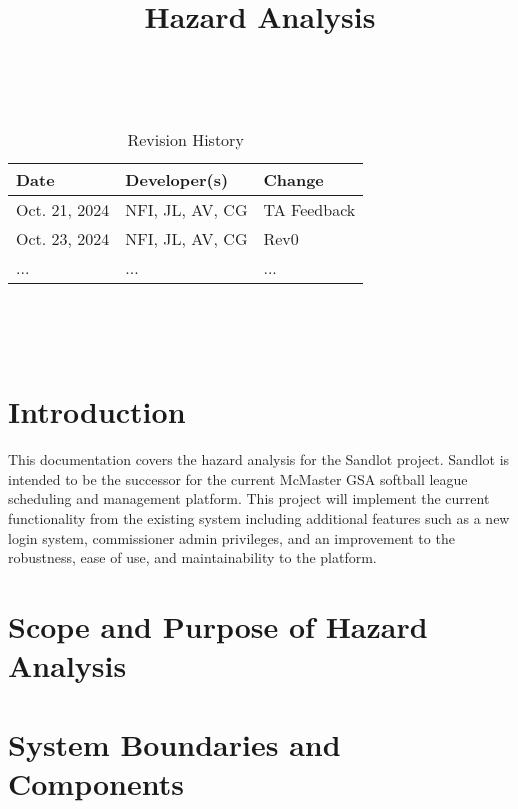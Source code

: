 \documentclass{article}
\title{Hazard Analysis\\\progname}
\author{\authname}
\date{}
\begin{document}
\maketitle
\thispagestyle{empty}

~\newpage


\begin{table}[hp]
\caption{Revision History} \label{TblRevisionHistory}
\begin{tabularx}{\textwidth}{llX}
\toprule
\textbf{Date} & \textbf{Developer(s)} & \textbf{Change}\\
\midrule
Oct. 21, 2024 & NFI, JL, AV, CG & TA Feedback\\
Oct. 23, 2024 & NFI, JL, AV, CG & Rev0\\
... & ... & ...\\
\bottomrule
\end{tabularx}
\end{table}

~\newpage

\tableofcontents

~\newpage


\section{Introduction}

This documentation covers the hazard analysis for the Sandlot project.
Sandlot is intended to be the successor for the current McMaster GSA
softball league scheduling and management platform. This project
will implement the current functionality from the existing system including
additional features such as a new login system, commissioner admin
privileges, and an improvement to the robustness, ease of use, and
maintainability to the platform.

\section{Scope and Purpose of Hazard Analysis}


\section{System Boundaries and Components}

\end{document}
